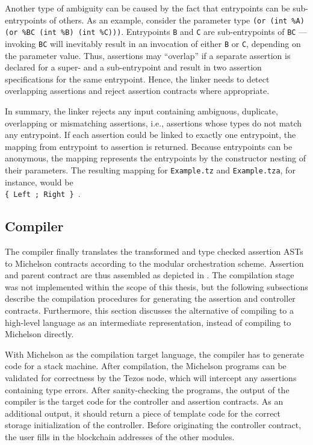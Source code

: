 Another type of ambiguity can be caused by the fact that entrypoints can be sub-entrypoints of others. As an example, consider the parameter type \texttt{(or (int \%A) (or \%BC (int \%B) (int \%C)))}. Entrypoints \texttt{B} and \texttt{C} are sub-entrypoints of \texttt{BC} --- invoking \texttt{BC} will inevitably result in an invocation of either \texttt{B} or \texttt{C}, depending on the parameter value. Thus, assertions may ``overlap'' if a separate assertion is declared for a super- and a sub-entrypoint and result in two assertion specifications for the same entrypoint. Hence, the linker needs to detect overlapping assertions and reject assertion contracts where appropriate.

In summary, the linker rejects any input containing ambiguous, duplicate, overlapping or mismatching assertions, i.e., assertions whose types do not match any entrypoint. If each assertion could be linked to exactly one entrypoint, the mapping from entrypoint to assertion is returned. Because entrypoints can be anonymous, the mapping represents the entrypoints by the constructor nesting of their parameters. The resulting mapping for \texttt{Example.tz} and \texttt{Example.tza}, for instance, would be \\
\texttt{\{ Left ; Right \} }.

\subsection{Compiler}\label{sec:compiler}
The compiler finally translates the transformed and type checked assertion ASTs to Michelson contracts according to the modular orchestration scheme. Assertion and parent contract are thus assembled as depicted in . The compilation stage was not implemented within the scope of this thesis, but the following subsections describe the compilation procedures for generating the assertion and controller contracts. Furthermore, this section discusses the alternative of compiling to a high-level language as an intermediate representation, instead of compiling to Michelson directly.

With Michelson as the compilation target language, the compiler has to generate code for a stack machine. After compilation, the Michelson programs can be validated for correctness by the Tezos node, which will intercept any assertions containing type errors. After sanity-checking the programs, the output of the compiler is the target code for the controller and assertion contracts. As an additional output, it should return a piece of template code for the correct storage initialization of the controller. Before originating the controller contract, the user fills in the blockchain addresses of the other modules.

